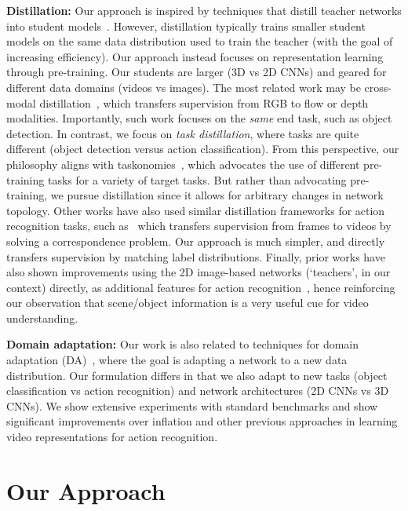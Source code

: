 \documentclass[10pt,twocolumn,letterpaper]{article}
\begin{document}
{\noindent \bf Distillation:} 
Our approach is inspired by techniques that distill teacher networks into student models~\cite{hinton2015distilling}. 
However, distillation typically trains smaller student models on the same data distribution used to train the teacher (with the goal of increasing efficiency). Our approach instead focuses on representation learning through pre-training. Our students are larger (3D vs 2D CNNs) and geared for different data domains (videos vs images).
The most related work may be cross-modal distillation~\cite{gupta2016cross}, which transfers supervision from RGB to flow or depth modalities. Importantly, such work focuses on the {\em same} end task, such as object detection. In contrast, we focus on {\em task distillation}, where tasks are quite different (object detection versus action classification). 
From this perspective, our philosophy aligns with taskonomies~\cite{zamir2018taskonomy}, which advocates the use of different pre-training tasks for a variety of target tasks. But rather than advocating pre-training, we pursue distillation since it 
allows for arbitrary changes in network topology.
Other works have also used similar distillation frameworks for action recognition tasks, such as~\cite{diba2018spatio} which transfers supervision from frames to videos by solving a correspondence problem. Our approach is much simpler, and directly transfers supervision by matching label distributions. Finally, prior works have also shown improvements using the 2D image-based networks (`teachers', in our context) directly, as additional features for action recognition~\cite{diba2017deep,girdhar2018better}, hence reinforcing our observation that scene/object information is a very useful cue
for video understanding.


{\noindent \bf Domain adaptation:} Our work is also related to techniques for domain adaptation (DA)~\cite{pan2009domain,saenko2010adapting}, where the goal is adapting a network to a new data distribution. Our formulation differs in that we also adapt to new tasks (object classification vs action recognition) and network architectures (2D CNNs vs 3D CNNs).
We show extensive
experiments with standard benchmarks and show significant improvements over inflation and other previous approaches
in learning video representations for action recognition. \section{Our Approach}\label{sec:approach}
\end{document}
